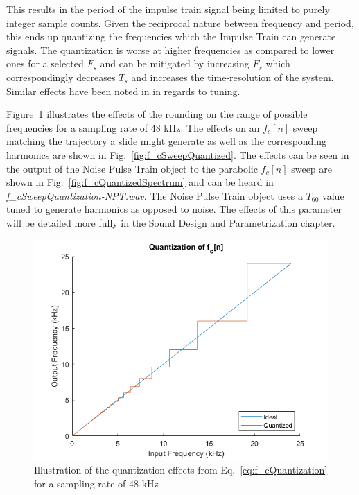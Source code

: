\documentclass[../main.tex]{subfiles}
\begin{document}
This results in the period of the impulse train signal being limited to purely integer sample counts. Given the reciprocal nature between frequency and period, this ends up quantizing the frequencies which the Impulse Train can generate signals. The quantization is worse at higher frequencies as compared to lower ones for a selected $F_s$ and can be mitigated by increasing $F_s$ which correspondingly decreases $T_s$ and increases the time-resolution of the system. Similar effects have been noted in  in regards to tuning.

Figure~\ref{fig:f_cQuantized} illustrates the effects of the rounding on the range of possible frequencies for a sampling rate of 48 kHz. The effects on an $f_c[n]$ sweep matching the trajectory a slide might generate as well as the corresponding harmonics are shown in Fig.~\ref{fig:f_cSweepQuantized}. The effects can be seen in the output of the Noise Pulse Train object to the parabolic $f_c[n]$ sweep are shown in Fig.~\ref{fig:f_cQuantizedSpectrum} and can be heard in \emph{f\_cSweepQuantization-NPT.wav}. The Noise Pulse Train object uses a $T_{60}$ value tuned to generate harmonics as opposed to noise. The effects of this parameter will be detailed more fully in the Sound Design and Parametrization chapter.

\begin{figure}[h]
    \centering
    \includegraphics[scale=.62]{./images/plots/f_cQuantization.png}
    \caption{Illustration of the quantization effects from Eq.~\ref{eq:f_cQuantization} for a sampling rate of 48 kHz}
    \label{fig:f_cQuantized}
\end{figure}
\end{document}
